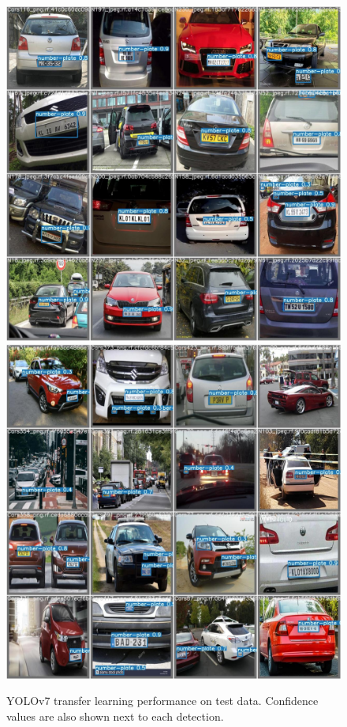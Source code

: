 \begin{figure}
        \centering
        \includegraphics[height=.5\textheight]{figures/transfer-learning-eval/test_batch0_pred.jpg}
        \includegraphics[height=.5\textheight]{figures/transfer-learning-eval/test_batch2_pred.jpg}
        \caption{YOLOv7 transfer learning performance on test data. Confidence
        values are also shown next to each detection.}
        \label{fig:yolo-test-eval}
\end{figure}





